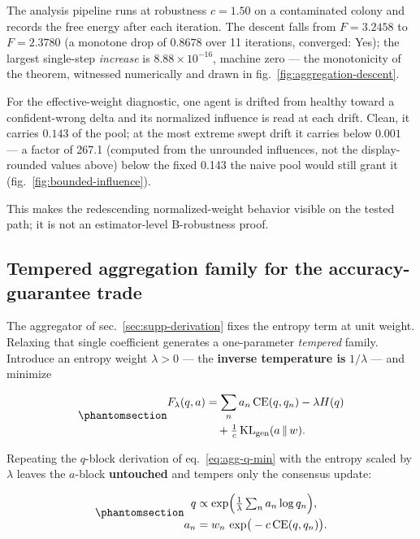 \documentclass[
  english,
]{article}
\theoremstyle{plain}
\theoremstyle{definition}
\theoremstyle{remark}
\theoremstyle{definition}
\begin{document}
The analysis pipeline runs  at robustness
\(c = 1.50\) on a contaminated colony and records the free energy after
each iteration. The descent falls from \(F = 3.2458\) to \(F = 2.3780\)
(a monotone drop of \(0.8678\) over 11 iterations, converged: Yes); the
largest single-step \emph{increase} is \(8.88 \times 10^{-16}\), machine
zero --- the monotonicity of the theorem, witnessed numerically and
drawn in fig.~\ref{fig:aggregation-descent}.

For the effective-weight diagnostic, one agent is drifted from healthy
toward a confident-wrong delta and its normalized influence is read at
each drift. Clean, it carries \(0.143\) of the pool; at the most extreme
swept drift it carries below \(0.001\) --- a factor of 267.1 (computed
from the unrounded influences, not the display-rounded values above)
below the fixed 0.143 the naive pool would still grant it
(fig.~\ref{fig:bounded-influence}).

This makes the redescending normalized-weight behavior visible on the
tested path; it is not an estimator-level B-robustness proof.

\subsection{Tempered aggregation family for the accuracy-guarantee
trade}\label{sec:supp-tempered}

The aggregator of sec.~\ref{sec:supp-derivation} fixes the entropy term
at unit weight. Relaxing that single coefficient generates a
one-parameter \emph{tempered} family. Introduce an entropy weight
\(\lambda > 0\) --- the \textbf{inverse temperature is} \(1/\lambda\)
--- and minimize

\begin{equation}\protect\phantomsection\label{eq:tempered-family}{\begin{aligned}
F_\lambda(q, a)
&= \sum_n a_n\,\mathrm{CE}(q, q_n) - \lambda H(q)\\
&\quad + \tfrac{1}{c}\,\mathrm{KL_{gen}}(a \,\|\, w).
\end{aligned}}\end{equation}

Repeating the \(q\)-block derivation of eq.~\ref{eq:agg-q-min} with the
entropy scaled by \(\lambda\) leaves the \(a\)-block \textbf{untouched}
and tempers only the consensus update:

\begin{equation}\protect\phantomsection\label{eq:tempered-updates}{\begin{aligned}
q
&\propto \exp\!\Big(
  \tfrac{1}{\lambda}\textstyle\sum_n a_n \log q_n\Big),\\
a_n
&= w_n\,\exp\!\big(-c\,\mathrm{CE}(q, q_n)\big).
\end{aligned}}\end{equation}
\end{document}
